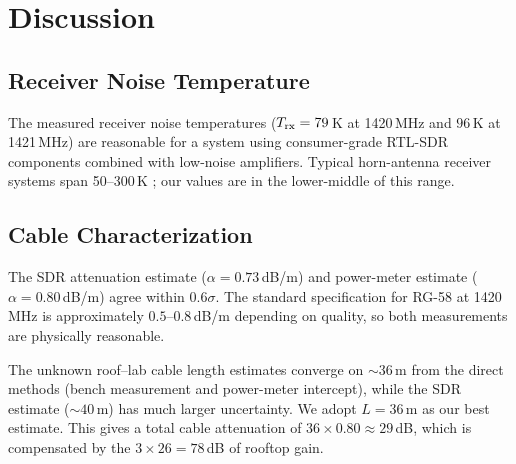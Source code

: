 \documentclass[10pt,preprint2]{aastex}
\begin{document}

\section{Discussion}
\label{sec:discussion}

\subsection{Receiver Noise Temperature}

The measured receiver noise temperatures ($T_{\rm rx} = 79$\,K at 1420\,MHz and
$96$\,K at 1421\,MHz) are reasonable for a system using consumer-grade
RTL-SDR components combined with low-noise amplifiers.
Typical horn-antenna receiver systems span 50--300\,K \citep{wilson2013};
our values are in the lower-middle of this range.


\subsection{Cable Characterization}

The SDR attenuation estimate ($\alpha = 0.73$\,dB/m) and power-meter
estimate ($\alpha = 0.80$\,dB/m) agree within $0.6\sigma$.
The standard specification for RG-58 at 1420\,MHz is approximately
$0.5$--$0.8$\,dB/m depending on quality, so both measurements are physically reasonable.

The unknown roof--lab cable length estimates converge on $\sim 36$\,m
from the direct methods (bench measurement and power-meter intercept),
while the SDR estimate ($\sim 40$\,m) has much larger uncertainty.
We adopt $L = 36$\,m as our best estimate.
This gives a total cable attenuation of $36 \times 0.80 \approx 29$\,dB,
which is compensated by the $3 \times 26 = 78$\,dB of rooftop gain.
\end{document}
